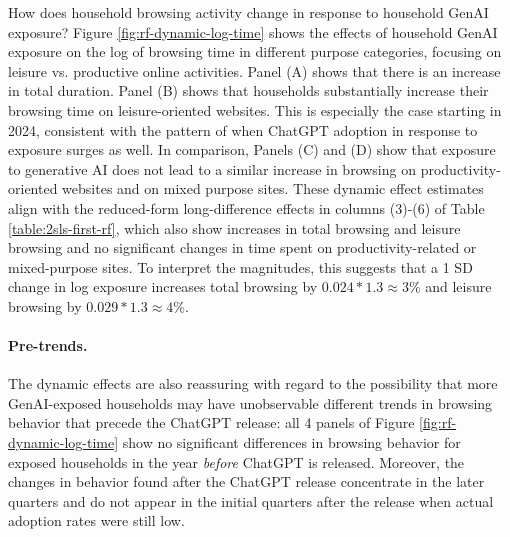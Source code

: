 \documentclass[12pt]{article}
\begin{document}
How does household browsing activity change in response to household GenAI exposure? Figure \ref{fig:rf-dynamic-log-time} shows the effects of household GenAI exposure on the log of browsing time in different purpose categories, focusing on leisure vs. productive online activities.
Panel (A) shows that there is an increase in total duration.
Panel (B) shows that households substantially increase their browsing time on leisure-oriented websites. This is especially the case starting in 2024, consistent with the pattern of when ChatGPT adoption in response to exposure surges as well. In comparison, Panels (C) and (D) show that exposure to generative AI does not lead to a similar increase in browsing on productivity-oriented websites and on mixed purpose sites.  These dynamic effect estimates align with the reduced-form long-difference effects in columns (3)-(6) of Table \ref{table:2sls-first-rf}, which also show increases in total browsing and leisure browsing and no significant changes in time spent on productivity-related or mixed-purpose sites. To interpret the magnitudes, this suggests that a 1 SD change in log exposure increases total browsing by $0.024*1.3\approx 3\%$
and leisure browsing by $0.029*1.3\approx 4\%$.
\paragraph{Pre-trends.} The dynamic effects are also reassuring with regard to the possibility that more GenAI-exposed households may have unobservable different trends in browsing behavior that precede the ChatGPT release: all 4 panels of Figure \ref{fig:rf-dynamic-log-time} show no significant differences in browsing behavior for exposed households in the year \textit{before} ChatGPT is released. Moreover, the changes in behavior found after the ChatGPT release concentrate in the later quarters and do not appear in the initial quarters after the release when actual adoption rates were still low.
\end{document}
